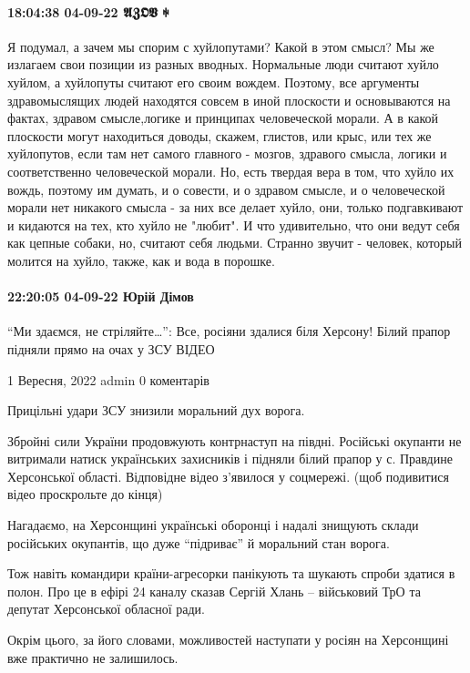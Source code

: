 \paragraph{18:04:38 04-09-22 𝕬𝖅𝕺𝖁 ꑭ}

Я подумал, а зачем мы спорим с хуйлопутами? Какой в этом смысл? Мы же излагаем
свои позиции из разных вводных. Нормальные люди считают хуйло хуйлом, а
хуйлопуты считают его своим вождем. Поэтому, все аргументы здравомыслящих людей
находятся совсем в иной плоскости и основываются на фактах, здравом
смысле,логике и принципах человеческой морали. А в какой плоскости могут
находиться доводы, скажем, глистов, или крыс, или тех же хуйлопутов, если там
нет самого главного - мозгов, здравого смысла, логики и соответственно
человеческой морали. Но, есть твердая вера в том, что хуйло их вождь, поэтому
им думать, и о совести, и о здравом смысле, и о человеческой морали нет
никакого смысла - за них все делает хуйло, они, только подгавкивают и кидаются
на тех, кто хуйло не "любит". И что удивительно, что они ведут себя как цепные
собаки, но, считают себя людьми. Странно звучит - человек, который молится на
хуйло, также, как и вода в порошке.

\paragraph{22:20:05 04-09-22 Юрій Дімов}

“Ми здаємся, не стріляйте…”: Все, росіяни здалися біля Херсону! Білий прапор
підняли прямо на очах у ЗСУ ВІДЕО

 1 Вересня, 2022 admin 0 коментарів

Прицільні удари ЗСУ знизили моральний дух ворога.

Збройні сили України продовжують контрнаступ на півдні. Російські окупанти не
витримали натиск українських захисників і підняли білий прапор у с. Правдине
Херсонської області. Відповідне відео з’явилося у соцмережі. (щоб подивитися
відео проскрольте до кінця)

Нагадаємо, на Херсонщині українські оборонці і надалі знищують склади
російських окупантів, що дуже “підриває” й моральний стан ворога.

Тож навіть командири країни-агресорки панікують та шукають спроби здатися в
полон. Про це в ефірі 24 каналу сказав Сергій Хлань – військовий ТрО та депутат
Херсонської обласної ради.

Окрім цього, за його словами, можливостей наступати у росіян на Херсонщині вже
практично не залишилось.

